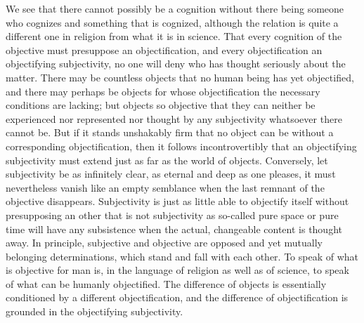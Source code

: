 \documentclass[12pt,a4paper]{article}
\begin{document}
We see that there cannot possibly be a cognition without there being
someone who cognizes and something that is cognized, although the
relation is quite a different one in religion from what it is in
science. That every cognition of the objective must presuppose an
objectification, and every objectification an objectifying
subjectivity, no one will deny who has thought seriously about the
matter. There may be countless objects that no human being has yet
objectified, and there may perhaps be objects for whose objectification
the necessary conditions are lacking; but objects so objective that
they can neither be experienced nor represented nor thought by any
subjectivity whatsoever there cannot be. But if it stands unshakably
firm that no object can be without a corresponding objectification,
then it follows incontrovertibly that an objectifying subjectivity must
extend just as far as the world of objects. Conversely, let
subjectivity be as infinitely clear, as eternal and deep as one
pleases, it must nevertheless vanish like an empty semblance when the
last remnant of the objective disappears. Subjectivity is just as
little able to objectify itself without presupposing an other that is
not subjectivity as so-called pure space or pure time will have any
subsistence when the actual, changeable content is thought away. In
principle, subjective and objective are opposed and yet mutually
belonging determinations, which stand and fall with each other. To
speak of what is objective for man is, in the language of religion as
well as of science, to speak of what can be humanly objectified. The
difference of objects is essentially conditioned by a different
objectification, and the difference of objectification is grounded in
the objectifying subjectivity.
\end{document}
